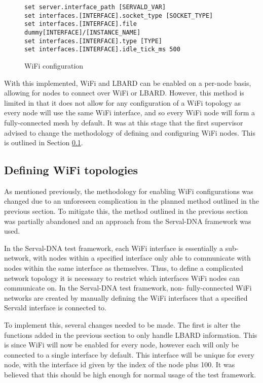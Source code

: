 \begin{figure}
    \begin{centering}
\begin{lstlisting}[basicstyle=\small, breaklines, frame=single]
set server.interface_path [SERVALD_VAR]
set interfaces.[INTERFACE].socket_type [SOCKET_TYPE]
set interfaces.[INTERFACE].file dummy[INTERFACE]/[INSTANCE_NAME]
set interfaces.[INTERFACE].type [TYPE]
set interfaces.[INTERFACE].idle_tick_ms 500
\end{lstlisting}
        \caption{WiFi configuration}
        \label{fig:chapter4WifiConfig}
    \end{centering}
\end{figure}

With this implemented, WiFi and LBARD can be enabled on a per-node basis, allowing for nodes to connect over WiFi or LBARD.
However, this method is limited in that it does not allow for any configuration of a WiFi topology as every node will use the same WiFi interface, and so every WiFi node will form a fully-connected mesh by default.
It was at this stage that the first supervisor advised to change the methodology of defining and configuring WiFi nodes.
This is outlined in Section \ref{subsection:DefiningWiFi}.


\subsection{Defining WiFi topologies}
\label{subsection:DefiningWiFi}
As mentioned previously, the methodology for enabling WiFi configurations was changed due to an unforeseen complication in the planned method outlined in the previous section.
To mitigate this, the method outlined in the previous section was partially abandoned and an approach from the Serval-DNA framework was used.

In the Serval-DNA test framework, each WiFi interface is essentially a sub-network, with nodes within a specified interface only able to communicate with nodes within the same interface as themselves.
Thus, to define a complicated network topology it is necessary to restrict which interfaces WiFi nodes can communicate on.
In the Serval-DNA test framework, non- fully-connected WiFi networks are created by manually defining the WiFi interfaces that a specified Servald interface is connected to.


To implement this, several changes needed to be made.
The first is alter the functions added in the previous section to only handle LBARD information.
This is since WiFi will now be enabled for every node, however each will only be connected to a single interface by default.
This interface will be unique for every node, with the interface id given by the index of the node plus 100.
It was believed that this should be high enough for normal usage of the test framework.

